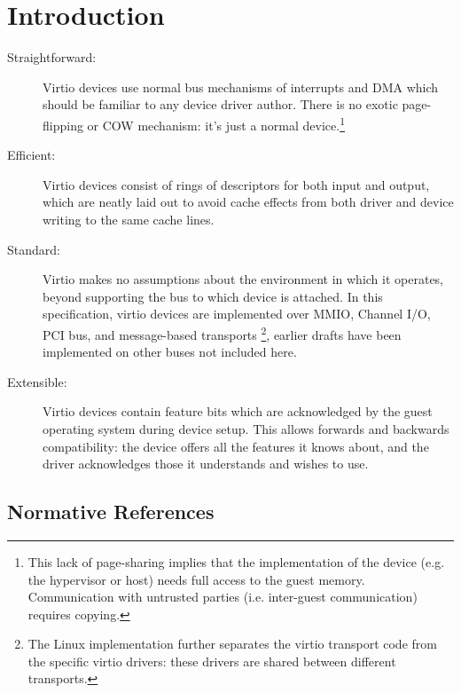 \chapter{Introduction}



\begin{description}
\item[Straightforward:] Virtio devices use normal bus mechanisms of
  interrupts and DMA which should be familiar to any device driver
  author. There is no exotic page-flipping or COW mechanism: it's just
  a normal device.\footnote{This lack of page-sharing implies that the implementation of the
device (e.g. the hypervisor or host) needs full access to the
guest memory. Communication with untrusted parties (i.e.
inter-guest communication) requires copying.
}

\item[Efficient:] Virtio devices consist of rings of descriptors
  for both input and output, which are neatly laid out to avoid cache
  effects from both driver and device writing to the same cache
  lines.

\item[Standard:] Virtio makes no assumptions about the environment in which
  it operates, beyond supporting the bus to which device is attached.
  In this specification, virtio
  devices are implemented over MMIO, Channel I/O, PCI bus, and message-based transports
\footnote{The Linux implementation further separates the virtio
transport code from the specific virtio drivers: these drivers are shared
between different transports.
}, earlier drafts
  have been implemented on other buses not included here.

\item[Extensible:] Virtio devices contain feature bits which are
  acknowledged by the guest operating system during device setup.
  This allows forwards and backwards compatibility: the device
  offers all the features it knows about, and the driver
  acknowledges those it understands and wishes to use.
\end{description}

\section{Normative References}\label{sec:Normative References}

